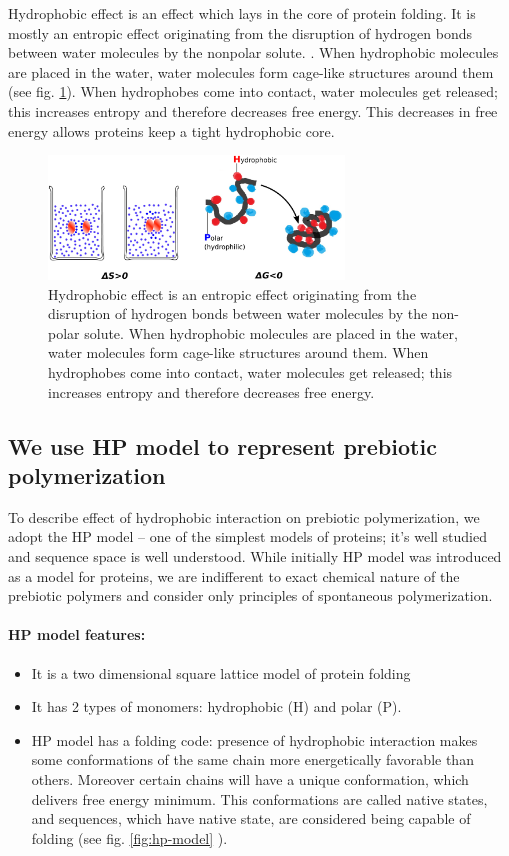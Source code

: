 \documentclass[12pt]{paper}
\begin{document}
Hydrophobic effect is an effect which lays in the core of protein folding. It is mostly an 
entropic effect originating from the disruption of hydrogen bonds between water 
molecules by the nonpolar solute. \cite{Silverstein1998}. When hydrophobic molecules are placed in 
the water, water molecules form cage-like structures around them (see fig. \ref{fig:hydro-effect}). 
When hydrophobes come into contact, water molecules get released; this increases entropy and 
therefore decreases free energy. This decreases in free energy allows proteins keep a tight 
hydrophobic core.
\begin{figure}[h!]
  \centering
  \includegraphics[width=0.7\textwidth]{pictures/hydrophobic-effect.pdf} 
  \caption{Hydrophobic effect is an entropic effect originating from the disruption of 
hydrogen bonds between water molecules by the non-polar solute.
When hydrophobic molecules are placed in the water, water molecules form cage-like 
structures around them. When hydrophobes come into contact, water 
molecules get released; this increases entropy and therefore decreases free energy. }
  \label{fig:hydro-effect}
\end{figure}

\subsection{We use HP model to represent prebiotic polymerization}
To describe effect of hydrophobic interaction on prebiotic polymerization, we adopt the HP model 
-- one of the simplest models of proteins; it's well studied and sequence space is well 
understood\cite{lau1989lattice,Chan1991,Miller1995,Yue1995,agarwala1997local}. While initially HP 
model was introduced as a model for proteins, we are indifferent to exact chemical nature of the 
prebiotic polymers and consider only principles of spontaneous polymerization.
\paragraph{HP model features:} 
\begin{itemize}
 \item It is a two dimensional square lattice model of protein folding
 \item It has 2 types of monomers: hydrophobic (H) and polar (P). 
 \item HP model has a folding code: presence of hydrophobic interaction makes some conformations 
of the same chain more energetically favorable than others. Moreover certain chains will have a 
unique conformation, which delivers free energy minimum. This conformations are called native 
states, and sequences, which have native state, are considered being capable of folding (see fig. 
\ref{fig:hp-model} ).
\end{itemize}
\end{document}
